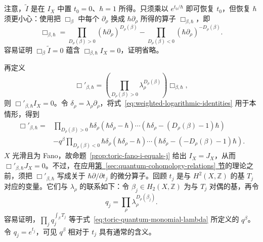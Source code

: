 \begin{example}
注意，$\widetilde I$ 是在 $I_X$ 中置 $t_0=0$、$\hbar=1$ 所得。只须乘以 $e^{t_0/\hbar}$ 即可恢复 $t_0$，但恢复 $\hbar$ 须更小心：使用把 $\Box_\beta$ 中每个 $\partial_\rho$ 换成 $\hbar\partial_\rho$ 所得的算子 $\Box_{\beta,\hbar}$，即
\[
\Box_{\beta,\hbar}=\prod_{D_\rho(\beta)>0}(\hbar\partial_\rho)^{D_\rho(\beta)}
-\prod_{D_\rho(\beta)<0}(\hbar\partial_\rho)^{-D_\rho(\beta)}.
\]
容易证明 $\Box_\beta\widetilde I=0$ 蕴含 $\Box_{\beta,\hbar}I_X=0$，证明省略。

再定义
\[
\Box'_{\beta,\hbar}=\left(\prod_{D_\rho(\beta)>0}\lambda_\rho^{D_\rho(\beta)}\right)\Box_{\beta,\hbar},
\]
则 $\Box'_{\beta,\hbar}I_X=0$。令 $\delta_\rho=\lambda_\rho\partial_\rho$，将式~\eqref{eq:weighted-logarithmic-identities} 用于本情形，得到
\begin{equation}\label{eq:toric-quantum-gkz-operator}
\begin{aligned}
\Box'_{\beta,\hbar}={}&\prod_{D_\rho(\beta)>0}
\hbar\delta_\rho(\hbar\delta_\rho-\hbar)\cdots(\hbar\delta_\rho-(D_\rho(\beta)-1)\hbar)\\
&-q^\beta\prod_{D_\rho(\beta)<0}
\hbar\delta_\rho(\hbar\delta_\rho-\hbar)\cdots(\hbar\delta_\rho-(-D_\rho(\beta)-1)\hbar).
\end{aligned}
\end{equation}
$X$ 光滑且为 Fano，故命题~\ref{prop:toric-fano-i-equals-j} 给出 $I_X=J_X$，从而 $\Box'_{\beta,\hbar}J_X=0$。不过，在应用\hyperref[sec:quantum-cohomology-relations]{第~\ref*{sec:quantum-cohomology-relations} 节}的理论之前，须把 $\Box'_{\beta,\hbar}$ 写成关于 $\hbar\partial/\partial t_j$ 的微分算子。回顾 $t_j$ 是与 $H^2(X,\mathbb Z)$ 的基 $T_j$ 对应的变量。它们与 $\lambda_\rho$ 的联系如下：令 $\beta_j\in H_2(X,\mathbb Z)$ 为与 $T_j$ 对偶的基，再令
\[
q_j=\prod_\rho\lambda_\rho^{D_\rho(\beta_j)}.
\]
容易证明，$\prod_jq_j^{\int_\beta T_j}$ 等于式~\eqref{eq:toric-quantum-monomial-lambda} 所定义的 $q^\beta$。令 $q_j=e^{t_j}$，可见 $q^\beta$ 相对于 $t_j$ 具有通常的含义。


\end{example}
